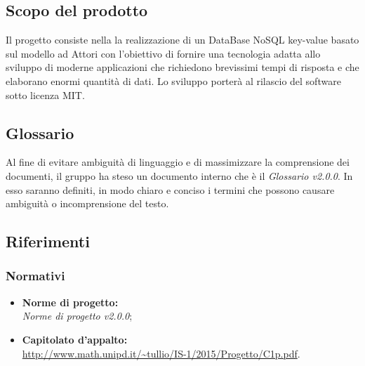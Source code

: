 \documentclass[a4paper]{article}
\begin{document}
		\subsection{Scopo del prodotto}
			Il progetto consiste nella la realizzazione di un DataBase NoSQL key-value basato sul modello ad 
			Attori con l'obiettivo di fornire una tecnologia adatta allo sviluppo di moderne 
			applicazioni che richiedono brevissimi tempi di risposta e che elaborano enormi quantità 
			di dati. Lo sviluppo porterà al rilascio del software sotto licenza MIT.
		\subsection{Glossario}
			Al fine di evitare ambiguità di linguaggio e di massimizzare la comprensione dei documenti, il 
	      gruppo ha steso un documento interno che è il \emph{Glossario v2.0.0}. In esso saranno definiti, in modo
	      chiaro e conciso i termini che possono causare ambiguità o incomprensione del testo.
		\subsection{Riferimenti}
			\subsubsection{Normativi}
				\begin{itemize}
					\item \textbf{Norme di progetto:} \\ \emph{Norme di progetto v2.0.0};
					\item \textbf{Capitolato d'appalto:} \\ \url{http://www.math.unipd.it/~tullio/IS-1/2015/Progetto/C1p.pdf}.
				\end{itemize}
\end{document}
